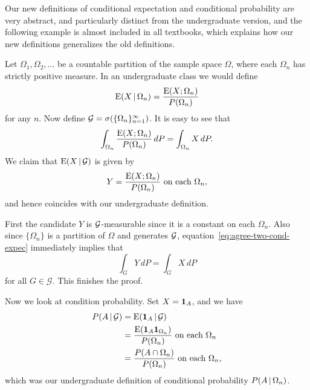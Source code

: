 
Our new definitions of conditional expectation and conditional probability are very abstract, and particularly distinct from the undergraduate version, and the following example is almost included in all textbooks, which explains how our new definitions generalizes the old definitions.

\begin{exa}
    Let $\Omega_1,\Omega_2,\dotsc$ be a countable partition of the sample space $\Omega$, where each $\Omega_n$ has strictly positive measure. In an undergraduate class we would define \[
        \mathop{}\!\mathrm{E}(X\,|\, \Omega_n) = \frac{\mathop{}\!\mathrm{E}(X;\Omega_n)}{P(\Omega_n)}
    \] for any $n$. Now define $\mathcal{G} = \sigma(\{\Omega_n\}_{n=1}^\infty)$. It is easy to see that \begin{equation} \label{eq:agree-two-cond-expec}
        \int_{\Omega_n} \frac{\E(X;\Omega_n)}{P(\Omega_n)} \,dP = \int_{\Omega_n} X\,dP.
    \end{equation} We claim that $\mathop{}\!\mathrm{E}(X\,|\, \mathcal{G})$ is given by \[
        Y = \frac{\mathop{}\!\mathrm{E}(X;\Omega_n)}{P(\Omega_n)} \text{ on each }\Omega_n,
    \] and hence coincides with our undergraduate definition.

    First the candidate $Y$ is $\mathcal{G}$-measurable since it is a constant on each $\Omega_n$. Also since $\{\Omega_n\}$ is a partition of $\Omega$ and generates $\mathcal{G}$, equation~\eqref{eq:agree-two-cond-expec} immediately implies that \[
        \int_G Y\,dP = \int_G X\,dP
    \] for all $G\in \mathcal{G}$. This finishes the proof.

    Now we look at condition probability. Set $X = \mathbf{1}_A$, and we have \begin{align*}
        P(A \,|\, \mathcal{G}) & = \mathop{}\!\mathrm{E}(\mathbf{1}_A\,|\,\mathcal{G}) \\ & = \frac{\mathop{}\!\mathrm{E}(\mathbf{1}_A\mathbf{1}_{\Omega_n})}{P(\Omega_n)} \text{ on each }\Omega_n \\ & = \frac{P(A\cap \Omega_n)}{P(\Omega_n)} \text{ on each }\Omega_n,
    \end{align*} which was our undergraduate definition of conditional probability $P(A\,|\, \Omega_n)$.
\end{exa}

